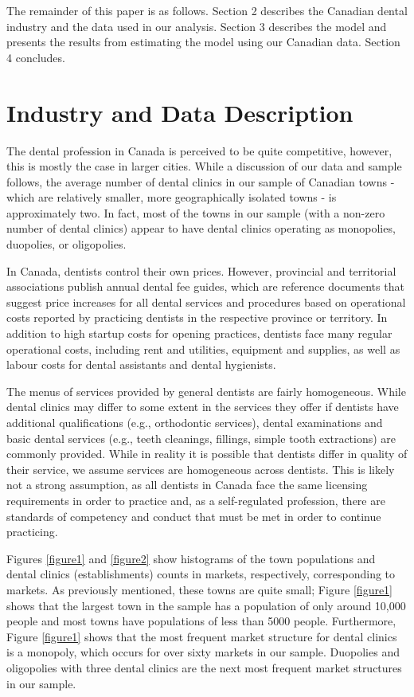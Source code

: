 \documentclass[a4paper,11pt]{article}
\begin{document}
The remainder of this paper is as follows. Section 2 describes the Canadian dental industry and the data used in our analysis. Section 3 describes the model and presents the results from estimating the model using our Canadian data. Section 4 concludes.

\section{Industry and Data Description}
The dental profession in Canada is perceived to be quite competitive, however, this is mostly the case in larger cities. While a discussion of our data and sample follows, the average number of dental clinics in our sample of Canadian towns - which are relatively smaller, more geographically isolated towns - is approximately two. In fact, most of the towns in our sample (with a non-zero number of dental clinics) appear to have dental clinics operating as monopolies, duopolies, or oligopolies.

In Canada, dentists control their own prices. However, provincial and territorial associations publish annual dental fee guides, which are reference documents that suggest price increases for all dental services and procedures based on operational costs reported by practicing dentists in the respective province or territory. In addition to high startup costs for opening practices, dentists face many regular operational costs, including rent and utilities, equipment and supplies, as well as labour costs for dental assistants and dental hygienists.

The menus of services provided by general dentists are fairly homogeneous. While dental clinics may differ to some extent in the services they offer if dentists have additional qualifications (e.g., orthodontic services), dental examinations and basic dental services (e.g., teeth cleanings, fillings, simple tooth extractions) are commonly provided. While in reality it is possible that dentists differ in quality of their service, we assume services are homogeneous across dentists. This is likely not a strong assumption, as all dentists in Canada face the same licensing requirements in order to practice and, as a self-regulated profession, there are standards of competency and conduct that must be met in order to continue practicing.


Figures \ref{figure1} and \ref{figure2} show histograms of the town populations and dental clinics (establishments) counts in markets, respectively, corresponding to markets. As previously mentioned, these towns are quite small; Figure \ref{figure1} shows that the largest town in the sample has a population of only around 10,000 people and most towns have populations of less than 5000 people. Furthermore, Figure \ref{figure1} shows that the most frequent market structure for dental clinics is a monopoly, which occurs for over sixty markets in our sample. Duopolies and oligopolies with three dental clinics are the next most frequent market structures in our sample.
\end{document}
